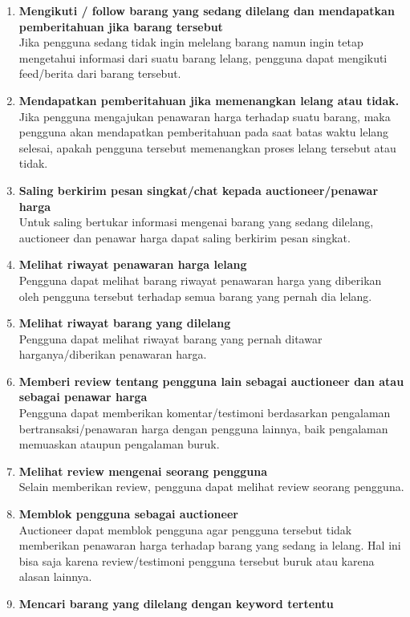 \begin{enumerate}
    \item \textbf{Mengikuti / follow barang yang sedang dilelang dan mendapatkan pemberitahuan jika barang tersebut }\\
        Jika pengguna sedang tidak ingin melelang barang namun ingin tetap mengetahui informasi dari suatu barang lelang, pengguna dapat mengikuti feed/berita dari barang tersebut.
    \item \textbf{Mendapatkan pemberitahuan jika memenangkan lelang atau tidak.}\\
        Jika pengguna mengajukan penawaran harga terhadap suatu barang, maka pengguna akan mendapatkan pemberitahuan pada saat batas waktu lelang selesai, apakah pengguna tersebut memenangkan proses lelang tersebut atau tidak.
    \item \textbf{Saling berkirim pesan singkat/chat kepada auctioneer/penawar harga }\\
        Untuk saling bertukar informasi mengenai barang yang sedang dilelang, auctioneer dan penawar harga dapat saling berkirim pesan singkat.
    \item \textbf{Melihat riwayat penawaran harga lelang }\\
        Pengguna dapat melihat barang riwayat penawaran harga yang diberikan oleh pengguna tersebut terhadap semua barang yang pernah dia lelang.
    \item \textbf{Melihat riwayat barang yang dilelang }\\
        Pengguna dapat melihat riwayat barang yang pernah ditawar harganya/diberikan penawaran harga.
    \item \textbf{Memberi review tentang pengguna lain sebagai auctioneer dan atau sebagai penawar harga }\\
        Pengguna dapat memberikan komentar/testimoni berdasarkan pengalaman bertransaksi/penawaran harga dengan pengguna lainnya, baik pengalaman memuaskan ataupun pengalaman buruk.
    \item\textbf{ Melihat review mengenai seorang pengguna }\\
        Selain memberikan review, pengguna dapat melihat review seorang pengguna.
    \item \textbf{Memblok pengguna sebagai auctioneer }\\
        Auctioneer dapat memblok pengguna agar pengguna tersebut tidak memberikan penawaran harga terhadap barang yang sedang ia lelang. Hal ini bisa saja karena review/testimoni pengguna tersebut buruk atau karena alasan lainnya.
    \item \textbf{Mencari barang yang dilelang dengan keyword tertentu} \\
  \end{enumerate}
  
